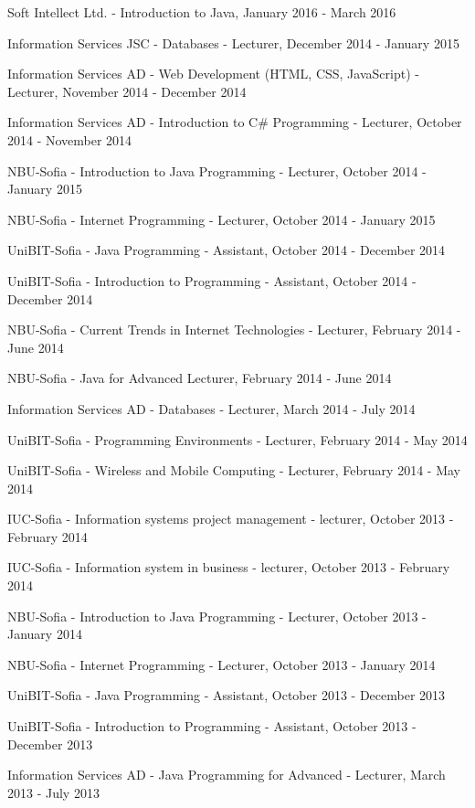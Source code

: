 \documentclass[english,a4paper]{europasscv}
\begin{document}
\begin{europasscv}
{\begin{ecvitemize}
    \item Soft Intellect Ltd. - Introduction to Java, January 2016 - March 2016
    \item Information Services JSC - Databases - Lecturer, December 2014 - January 2015
    \item Information Services AD - Web Development (HTML, CSS, JavaScript) - Lecturer, November 2014 - December 2014
    \item Information Services AD - Introduction to C\# Programming - Lecturer, October 2014 - November 2014
    \item NBU-Sofia - Introduction to Java Programming - Lecturer, October 2014 - January 2015
    \item NBU-Sofia - Internet Programming - Lecturer, October 2014 - January 2015
        \item UniBIT-Sofia - Java Programming - Assistant, October 2014 - December 2014
    \item UniBIT-Sofia - Introduction to Programming - Assistant, October 2014 - December 2014
    \item NBU-Sofia - Current Trends in Internet Technologies - Lecturer, February 2014 - June 2014
    \item NBU-Sofia - Java for Advanced Lecturer, February 2014 - June 2014
    \item Information Services AD - Databases - Lecturer, March 2014 - July 2014
    \item UniBIT-Sofia - Programming Environments - Lecturer, February 2014 - May 2014
    \item UniBIT-Sofia - Wireless and Mobile Computing - Lecturer, February 2014 - May 2014
    \item IUC-Sofia - Information systems project management - lecturer, October 2013 - February 2014
    \item IUC-Sofia - Information system in business - lecturer, October 2013 - February 2014
    \item NBU-Sofia - Introduction to Java Programming - Lecturer, October 2013 - January 2014
    \item NBU-Sofia - Internet Programming - Lecturer, October 2013 - January 2014
    \item UniBIT-Sofia - Java Programming - Assistant, October 2013 - December 2013
    \item UniBIT-Sofia - Introduction to Programming - Assistant, October 2013 - December 2013
    \item Information Services AD - Java Programming for Advanced - Lecturer, March 2013 - July 2013

\end{ecvitemize}}
\end{europasscv}
\end{document}

